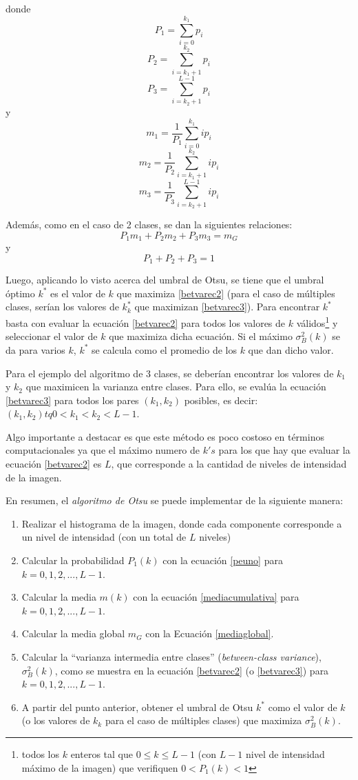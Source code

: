 donde $$P_1=\sum_{i=0}^{k_1}p_i$$ $$P_2=\sum_{i=k_1+1}^{k_2}p_i$$  $$P_3=\sum_{i=k_2+1}^{L-1}p_i$$ y $$m_1 = \frac{1}{P_1}\sum_{i=0}^{k_1}ip_i$$  $$m_2 = \frac{1}{P_2}\sum_{i=k_1+1}^{k_2}ip_i$$  $$m_3 = \frac{1}{P_3}\sum_{i=k_2+1}^{L-1}ip_i$$

Además, como en el caso de 2 clases, se dan la siguientes relaciones:
\begin{equation}
  P_1m_1 + P_2m_2 + P_3m_3 = m_G
\end{equation}
y
\begin{equation}
  P_1+P_2+P_3 = 1
\end{equation}

Luego, aplicando lo visto acerca del umbral de Otsu, se tiene que el umbral óptimo $k^*$ es el valor de $k$ que maximiza \ref{betvarec2} (para el caso de múltiples clases, serían los valores de $k_k^*$ que maximizan \ref{betvarec3}). Para encontrar $k^*$ basta con evaluar la ecuación \ref{betvarec2} para todos los valores de $k$ válidos\footnote{ todos los $k$ enteros tal que $0{\leq}k{\leq}L-1$ (con $L-1$ nivel de intensidad máximo de la imagen) que verifiquen $0<P_1(k)<1$ } y seleccionar el valor de $k$ que maximiza dicha ecuación. Si el máximo ${\sigma}_B^2(k)$ se da para varios $k$, $k^*$ se calcula como el promedio de los $k$ que dan dicho valor.

Para el ejemplo del algoritmo de 3 clases, se deberían encontrar los valores de $k_1$ y $k_2$ que maximicen la varianza entre clases. Para ello, se evalúa la ecuación \ref{betvarec3} para todos los pares $(k_1,k_2)$ posibles, es decir: $(k_1,k_2) tq 0<k_1<k_2<L-1$.

Algo importante a destacar es que este método es poco costoso en términos computacionales ya que el máximo numero de $k's$ para los que hay que evaluar la ecuación \ref{betvarec2} es $L$, que corresponde a la cantidad de niveles de intensidad de la imagen.

En resumen, el \textit{algoritmo de Otsu} se puede implementar de la siguiente manera:
\begin{enumerate}
 \item Realizar el histograma de la imagen, donde cada componente corresponde a un nivel de intensidad (con un total de $L$ niveles)
 \item Calcular la probabilidad $P_1(k)$ con la ecuación \ref{peuno} para $k=0,1,2,...,L-1$.
 \item Calcular la media $m(k)$ con la ecuación \ref{mediacumulativa} para $k=0,1,2,...,L-1$.
 \item Calcular la media global $m_G$ con la Ecuación \ref{mediaglobal}.
 \item Calcular la ``varianza intermedia entre clases'' (\textit{between-class variance}), ${\sigma}_B^2(k)$, como se muestra en la ecuación \ref{betvarec2} (o \ref{betvarec3})  para $k=0,1,2,...,L-1$.
 \item A partir del punto anterior, obtener el umbral de Otsu $k^*$ como el valor de $k$ (o los valores de $k_k$ para el caso de múltiples clases) que maximiza ${\sigma}_B^2(k)$.
\end{enumerate}

